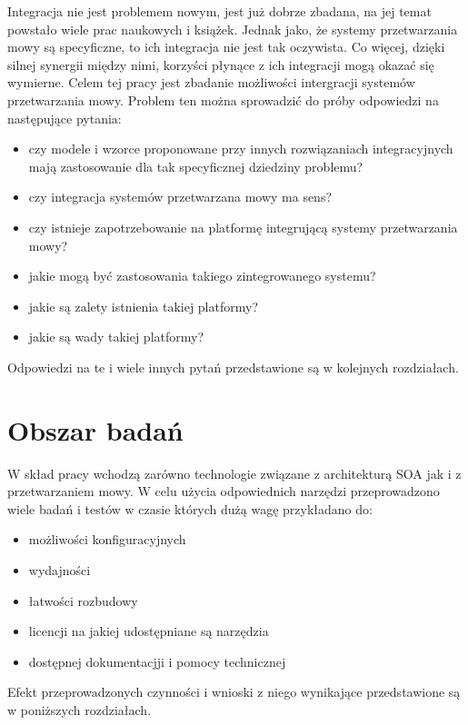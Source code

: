 Integracja nie jest problemem nowym, jest już dobrze zbadana, na jej temat powstało wiele prac naukowych i książek. Jednak jako, że systemy przetwarzania mowy są specyficzne, to ich integracja nie jest tak oczywista. Co więcej, dzięki silnej synergii między nimi, korzyści płynące z ich integracji mogą okazać się wymierne. Celem tej pracy jest zbadanie możliwości intergracji systemów przetwarzania mowy. Problem ten można sprowadzić do próby odpowiedzi na następujące pytania:
 \begin{itemize}
	\item  czy modele i wzorce proponowane przy innych rozwiązaniach integracyjnych mają zastosowanie dla tak specyficznej dziedziny problemu?
	\item  czy integracja systemów przetwarzana mowy ma sens?
	\item czy istnieje zapotrzebowanie na platformę integrującą systemy przetwarzania mowy?
	\item jakie mogą być zastosowania takiego zintegrowanego systemu?
	\item jakie są zalety istnienia takiej platformy?
	\item jakie są wady takiej platformy?
\end{itemize}  
Odpowiedzi na te i wiele innych pytań przedstawione są w kolejnych rozdziałach.

\section{Obszar badań} %
W skład  pracy wchodzą zarówno technologie związane z architekturą SOA jak i z przetwarzaniem mowy. W celu użycia odpowiednich narzędzi przeprowadzono wiele badań i testów w czasie których dużą wagę przykładano do:
\begin{itemize}
 	\item możliwości konfiguracyjnych
	\item wydajności
	\item łatwości rozbudowy
	\item licencji na jakiej udostępniane są narzędzia
	\item dostępnej dokumentacjji i pomocy technicznej
\end{itemize}
Efekt przeprowadzonych czynności i wnioski z niego wynikające przedstawione są w poniższych rozdziałach.


